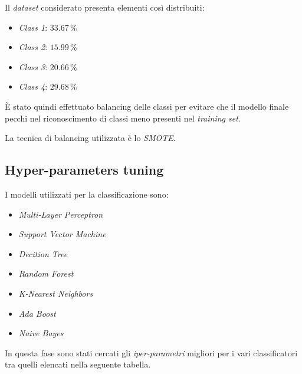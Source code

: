                         Il \textit{dataset} considerato presenta elementi così distribuiti:
                        \begin{itemize}
                                \item \textit{Class 1}: $33.67 \, \%$
                                \item \textit{Class 2}: $15.99 \, \%$
                                \item \textit{Class 3}: $20.66 \, \%$
                                \item \textit{Class 4}: $29.68 \, \%$
                        \end{itemize}
                        
                        \`E stato quindi effettuato balancing delle classi per evitare che il modello finale pecchi nel riconoscimento di classi meno presenti nel \textit{training set}.
                        
                        La tecnica di balancing utilizzata è lo \textit{SMOTE}.

                

        \subsection{Hyper-parameters tuning}
        
                I modelli utilizzati per la classificazione sono:
                \begin{itemize}
                        \item \textit{Multi-Layer Perceptron}
                        \item \textit{Support Vector Machine}
                        \item \textit{Decition Tree}
                        \item \textit{Random Forest}
                        \item \textit{K-Nearest Neighbors}
                        \item \textit{Ada Boost}
                        \item \textit{Naive Bayes}
                \end{itemize}
            
                In questa fase sono stati cercati gli \textit{iper-parametri} migliori per i vari classificatori tra quelli elencati nella seguente tabella.
                
